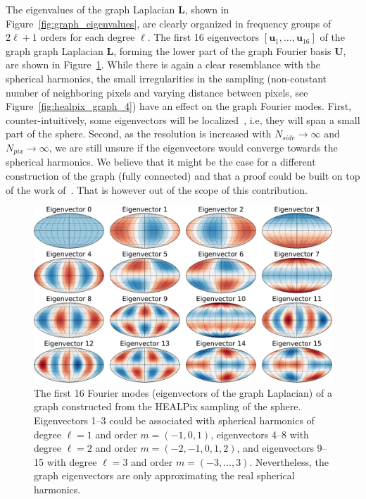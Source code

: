 \documentclass[final,twocolumn,3p,times,authoryear]{elsarticle}
\newcommand{\figref}[1]{Figure~\ref{fig:#1}}
\renewcommand{\b}[1]{{\bm{#1}}}   %
\newcommand{\1}{\b{1}}              %
\newcommand{\0}{\b{0}}              %
\renewcommand{\L}{\b{L}}
\newcommand{\U}{\b{U}}
\begin{document}
The eigenvalues of the graph Laplacian $\L$, shown in \figref{graph_eigenvalues}, are clearly organized in frequency groups of $2\ell + 1$ orders for each degree $\ell$.
The first 16 eigenvectors $[\b u_1, \ldots, \b u_{16}]$ of the graph graph Laplacian $\L$, forming the lower part of the graph Fourier basis $\U$, are shown in \figref{graph_harmonics}. While there is again a clear resemblance with the spherical harmonics, the small irregularities in the sampling (non-constant number of neighboring pixels and varying distance between pixels, see \figref{healpix_graph_4}) have an effect on the graph Fourier modes.
First, counter-intuitively, some eigenvectors will be localized~\citep{perraudin2018global}, i.e, they will span a small part of the sphere.
Second, as the resolution is increased with $N_{side} \rightarrow \infty$ and $N_{pix} \rightarrow \infty$, we are still unsure if the eigenvectors would converge towards the spherical harmonics. We believe that it might be the case for a different construction of the graph (fully connected) and that a proof could be built on top of the work of~\cite{belkin2007convergence}. That is however out of the scope of this contribution.

\begin{figure}[!htb]
\centering
\includegraphics[width=\linewidth]{figures/eigenvectors}
\caption{The first 16 Fourier modes (eigenvectors of the graph Laplacian) of a graph constructed from the HEALPix sampling of the sphere. Eigenvectors 1--3 could be associated with spherical harmonics of degree $\ell=1$ and order $m=(-1,0,1)$, eigenvectors 4--8 with degree $\ell=2$ and order $m=(-2,-1,0,1,2)$, and eigenvectors 9--15 with degree $\ell=3$ and order $m=(-3,\ldots,3)$. Nevertheless, the graph eigenvectors are only approximating the real spherical harmonics.}
\label{fig:graph_harmonics}
\end{figure}
\end{document}

